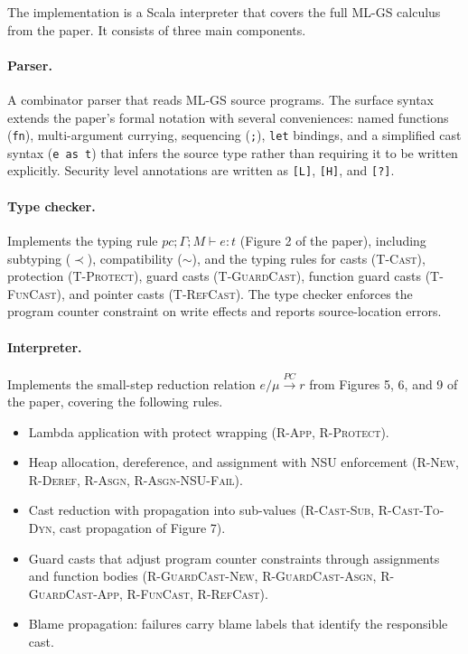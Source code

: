 \documentclass[11pt,a4paper]{article}
\begin{document}
The implementation is a Scala interpreter that covers the full ML-GS calculus from the paper.
It consists of three main components.

\paragraph{Parser.} A combinator parser that reads ML-GS source programs. The surface syntax
extends the paper's formal notation with several conveniences: named functions (\texttt{fn}),
multi-argument currying, sequencing (\texttt{;}), \texttt{let} bindings, and a simplified cast
syntax (\texttt{e as t}) that infers the source type rather than requiring it to be written
explicitly. Security level annotations are written as \texttt{[L]}, \texttt{[H]}, and
\texttt{[?]}.

\paragraph{Type checker.} Implements the typing rule $pc;\Gamma;M \vdash e : t$ (Figure 2
of the paper), including subtyping ($\prec$), compatibility ($\sim$), and the typing rules for
casts (\textsc{T-Cast}), protection (\textsc{T-Protect}), guard casts (\textsc{T-GuardCast}),
function guard casts (\textsc{T-FunCast}), and pointer casts (\textsc{T-RefCast}). The type
checker enforces the program counter constraint on write effects and reports source-location
errors.

\paragraph{Interpreter.} Implements the small-step reduction relation $e/\mu \xrightarrow{PC} r$
from Figures 5, 6, and 9 of the paper, covering the following rules.
\begin{itemize}
  \item Lambda application with protect wrapping (\textsc{R-App}, \textsc{R-Protect}).
  \item Heap allocation, dereference, and assignment with NSU enforcement
        (\textsc{R-New}, \textsc{R-Deref}, \textsc{R-Asgn}, \textsc{R-Asgn-NSU-Fail}).
  \item Cast reduction with propagation into sub-values (\textsc{R-Cast-Sub},
        \textsc{R-Cast-To-Dyn}, cast propagation of Figure 7).
  \item Guard casts that adjust program counter constraints through assignments and
        function bodies (\textsc{R-GuardCast-New}, \textsc{R-GuardCast-Asgn},
        \textsc{R-GuardCast-App}, \textsc{R-FunCast}, \textsc{R-RefCast}).
  \item Blame propagation: failures carry blame labels that identify the responsible cast.
\end{itemize}
\end{document}
